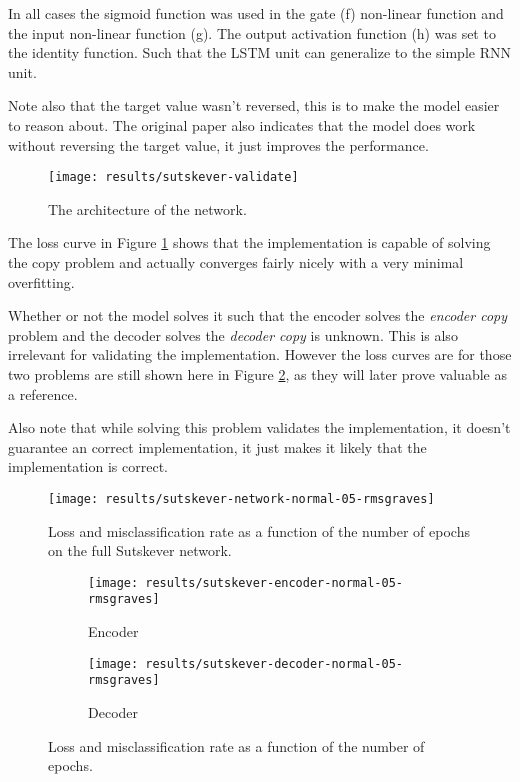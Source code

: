 In all cases the sigmoid function was used in the gate (f) non-linear function and the input non-linear function (g). The output activation function (h) was set to the identity function. Such that the LSTM unit can generalize to the simple RNN unit.

Note also that the target value wasn't reversed, this is to make the model easier to reason about. The original paper \cite{sutskever} also indicates that the model does work without reversing the target value, it just improves the performance.

\begin{figure}[H]
	\centering
	\texttt{[image: results/sutskever-validate]}
	\caption{The architecture of the network.}
\end{figure}

The loss curve in Figure \ref{fig:results:sutskever:network-05} shows that the implementation is capable of solving the copy problem and actually converges fairly nicely with a very minimal overfitting.

Whether or not the model solves it such that the encoder solves the \textit{encoder copy} problem and the decoder solves the \textit{decoder copy} is unknown. This is also irrelevant for validating the implementation. However the loss curves are for those two problems are still shown here in Figure \ref{fig:results:sutskever:decoder-encoder-05}, as they will later prove valuable as a reference.

Also note that while solving this problem validates the implementation, it doesn't guarantee an correct implementation, it just makes it likely that the implementation is correct.

\begin{figure}[h]
	\centering
	\texttt{[image: results/sutskever-network-normal-05-rmsgraves]}
	\caption{Loss and misclassification rate as a function of the number of epochs on the full Sutskever network.}
	\label{fig:results:sutskever:network-05}
\end{figure}
\begin{figure}[H]
        \vspace{-0.5cm}
        \centering
        \begin{subfigure}[b]{0.49\textwidth}
                \texttt{[image: results/sutskever-encoder-normal-05-rmsgraves]}
                \caption{Encoder}
        \end{subfigure}
        \begin{subfigure}[b]{0.49\textwidth}
                \texttt{[image: results/sutskever-decoder-normal-05-rmsgraves]}
                \caption{Decoder}
        \end{subfigure}
        \caption{Loss and misclassification rate as a function of the number of epochs.}
        \label{fig:results:sutskever:decoder-encoder-05}
\end{figure}


